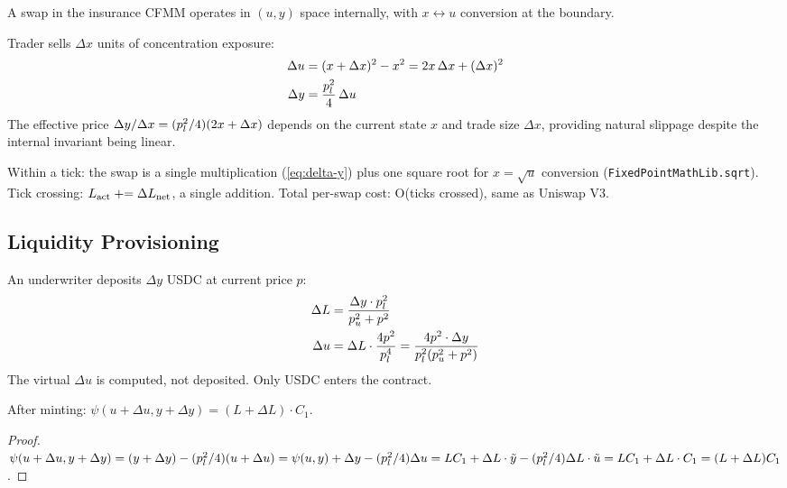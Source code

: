 A swap in the insurance CFMM operates in $(u, y)$ space internally, with
$x \leftrightarrow u$ conversion at the boundary.

\begin{definition}[Swap]\label{def:swap}
Trader sells $\Delta x$ units of concentration exposure:
\begin{align}
  \Delta u &= (x + \Delta x)^2 - x^2 = 2x\,\Delta x + (\Delta x)^2 \label{eq:delta-u} \\
  \Delta y &= \frac{p_l^2}{4}\, \Delta u \label{eq:delta-y}
\end{align}
The effective price $\Delta y / \Delta x = (p_l^2/4)(2x + \Delta x)$ depends on
the current state $x$ and trade size $\Delta x$, providing natural slippage
despite the internal invariant being linear.
\end{definition}

\begin{remark}[O(1) Complexity]
Within a tick: the swap is a single multiplication (\cref{eq:delta-y}) plus
one square root for $x = \sqrt{u}$ conversion (\texttt{FixedPointMathLib.sqrt}).
Tick crossing: $L_{\text{act}} \mathrel{+}= \Delta L_{\text{net}}$, a single addition.
Total per-swap cost: O(ticks crossed), same as Uniswap V3.
\end{remark}

\subsection{Liquidity Provisioning}

\begin{definition}\label{def:single-sided}
An underwriter deposits $\Delta y$ USDC at current price $p$:
\begin{align}
  \Delta L &= \frac{\Delta y \cdot p_l^2}{p_u^2 + p^2} \label{eq:mint-L} \\
  \Delta u &= \Delta L \cdot \frac{4p^2}{p_l^4}
             = \frac{4p^2 \cdot \Delta y}{p_l^2(p_u^2 + p^2)} \label{eq:mint-u}
\end{align}
The virtual $\Delta u$ is computed, not deposited. Only USDC enters the contract.
\end{definition}

\begin{proposition}\label{prop:mint-invariant}
After minting: $\psi(u + \Delta u, y + \Delta y) = (L + \Delta L) \cdot C_1$.
\end{proposition}

\begin{proof}
$\psi(u + \Delta u, y + \Delta y) = (y + \Delta y) - (p_l^2/4)(u + \Delta u)
= \psi(u, y) + \Delta y - (p_l^2/4)\Delta u
= L C_1 + \Delta L \cdot \tilde{y} - (p_l^2/4)\Delta L \cdot \tilde{u}
= L C_1 + \Delta L \cdot C_1 = (L + \Delta L) C_1$. \qedhere
\end{proof}
